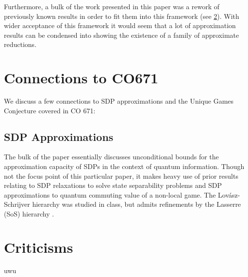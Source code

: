 \documentclass[runningheads,a4paper,english]{llncs}[2022/01/12]
\begin{document}
Furthermore, a bulk of the work presented in this paper was a rework of previously known results in order to fit them into this framework (see \cref{sec:criticisms}). 
With wider acceptance of this framework it would seem that a lot of approximation results can be condensed into showing the existence of a family of approximate reductions.

\section{Connections to CO671}
We discuss a few connections to SDP approximations and the Unique Games Conjecture covered in CO 671:
\subsection{SDP Approximations}
The bulk of the paper essentially discusses unconditional bounds for the approximation capacity of SDPs in the context of quantum information.
Though not the focus point of this particular paper, it makes heavy use of prior results relating to SDP relaxations to solve state separability problems and SDP approximations to quantum commuting value of a non-local game.
The Lov\'asz-Schrijver hierarchy was studied in class, but admits refinements by the Lasserre (SoS) hierarchy \cite{laurent2003comparison}.

\section{Criticisms}
\label{sec:criticisms}
uwu



\end{document}
